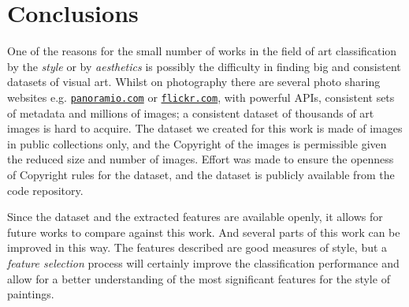 \documentclass[11pt,a4paper,twoside,openright]{report}
\renewcommand{\bibname}{References}
\begin{document}
%
%
%
%
%
%


\clearpage{\pagestyle{empty}\cleardoublepage}
\chapter{Conclusions}

One of the reasons for the small number of works in the field of art
classification by the \emph{style} or by \emph{aesthetics} is possibly the
difficulty in finding big and consistent datasets of visual art.  Whilst on
photography there are several photo sharing websites e.g.
\href{http://panoramio.com}{\texttt{panoramio.com}} or
\href{http://flickr.com}{\texttt{flickr.com}}, with powerful APIs, consistent
sets of metadata and millions of images;  a consistent dataset of thousands of
art images is hard to acquire.  The dataset we created for this work is made of
images in public collections only, and the Copyright of the images is
permissible given the reduced size and number of images.  Effort was made to
ensure the openness of Copyright rules for the dataset, and the dataset is
publicly available from the code repository.

Since the dataset and the extracted features are available openly, it allows
for future works to compare against this work.  And several parts of this work
can be improved in this way.  The features described are good measures of
style, but a \emph{feature selection} process will certainly improve the
classification performance and allow for a better understanding of the most
significant features for the style of paintings.


\newpage
{}
\addcontentsline{toc}{chapter}{\bibname}
\end{document}
